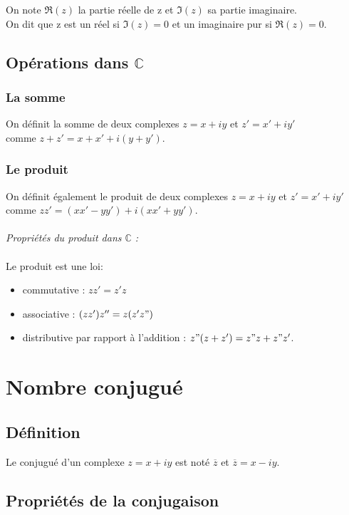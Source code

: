 \documentclass[a4paper,10pt]{book}
\newcommand{\C}{\mathbb{C}}
\begin{document}
On note $\Re(z)$ la partie réelle de z et $\Im(z)$ sa partie imaginaire.\\

On dit que z est un réel si $\Im(z)=0$ et un imaginaire pur si $\Re(z)=0$.

\subsection{Opérations dans $\C$}


\subsubsection{La somme}
On définit la somme de deux complexes $z=x+iy$ et $z'=x'+iy'$\\
comme $z+z'=x+x'+i(y+y')$.\\

\subsubsection{Le produit}
On définit également le produit de deux complexes $z=x+iy$ et $z'=x'+iy'$\\
comme $zz'=(xx'-yy')+i(xx'+yy')$.\\\\

\emph{Propriétés du produit dans $\C$ :}\\ \\
Le produit est une loi: \begin{itemize}\renewcommand{\labelitemi}{$\bullet$}
\item commutative : $zz'=z'z$
\item associative : $(zz')z''=z(z'z")$
\item distributive par rapport à l'addition : $z"(z+z')=z"z+z"z'$.\\
\end{itemize}


\section{Nombre conjugué}
\subsection{Définition}
Le conjugué d'un complexe $z=x+iy$ est noté $\overline{z}$ et $\overline{z}=x-iy$.\\

\subsection{Propriétés de la conjugaison}
\end{document}
